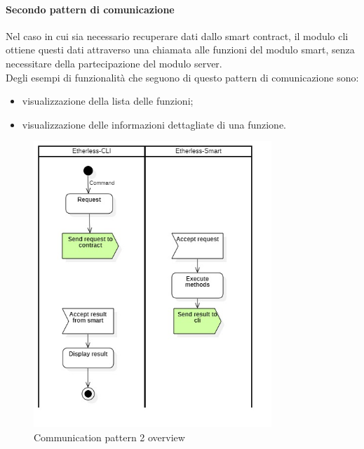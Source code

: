 	\paragraph{Secondo pattern di comunicazione}
		Nel caso in cui sia necessario recuperare dati dallo smart contract, il modulo cli ottiene questi dati attraverso una chiamata alle funzioni del modulo smart, senza necessitare della partecipazione del modulo server.\\  Degli esempi di funzionalità che seguono di questo pattern di comunicazione sono:
		\begin{itemize}
			\item visualizzazione della lista delle funzioni;
			\item visualizzazione delle informazioni dettagliate di una funzione.
		\end{itemize}
	\begin{figure}[H]
		\centering
		\includegraphics[width=0.8\textwidth]{././diagrammi/generali/activity_diag_pattern1.jpg}
		\caption{Communication pattern 2 overview}
	\end{figure}
